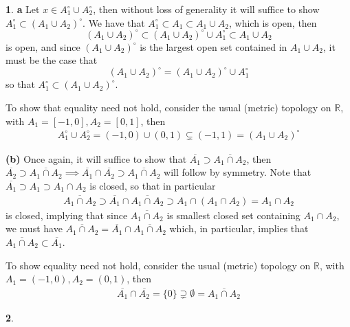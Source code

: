 \documentclass[10.5pt]{article}
\theoremstyle{definition}
\newtheorem{pb}{}
\newcommand{\set}[1]{\{#1\}}
\begin{document}
    \begin{pb}
        \textbf{a} Let \(x \in A_1^\circ \cup A_2^\circ\), then without loss of generality it will suffice to show \(A_1^\circ \subset (A_1 \cup A_2)^\circ\). We have that \(A_1^\circ \subset A_1 \subset A_1 \cup A_2\), which is open, then
        \[(A_1 \cup A_2)^\circ \subset (A_1 \cup A_2)^\circ \cup A_1^\circ \subset A_1 \cup A_2\]
        is open, and since  \((A_1 \cup A_2)^\circ\) is the largest open set contained in \(A_1 \cup A_2\), it must be the case that
        \[(A_1 \cup A_2)^\circ = (A_1 \cup A_2)^\circ \cup A_1^\circ\]
        so that \(A_1^\circ \subset (A_1 \cup A_2)^\circ\).
        
        To show that equality need not hold, consider the usual (metric) topology on \(\mathbb{R}\), with \(A_1 = [-1,0], A_2 = [0,1]\), then
        \begin{align*}
            A_1^\circ \cup A_2^\circ = (-1,0) \cup (0,1) \subsetneq (-1,1) = (A_1 \cup A_2)^\circ
        \end{align*}

        \textbf{(b)} Once again, it will suffice to show that \(\overline{A_1} \supset \overline{A_1 \cap A_2}\), then \(\overline{A_2} \supset \overline{A_1 \cap A_2} \implies \overline{A_1} \cap \overline{A_2} \supset \overline{A_1 \cap A_2}\) will follow by symmetry. Note that \(\overline{A_1} \supset A_1 \supset A_1\cap A_2\) is closed, so that in particular
        \begin{align*}
            \overline{A_1 \cap A_2} \supset \overline{A_1} \cap \overline{A_1 \cap A_2} \supset A_1 \cap (A_1 \cap A_2) = A_1 \cap A_2
        \end{align*}
        is closed, implying that since \(\overline{A_1 \cap A_2}\) is smallest closed set containing \(A_1 \cap A_2\), we must have \(\overline{A_1 \cap A_2} = \overline{A_1} \cap \overline{A_1 \cap A_2}\) which, in particular, implies that \(\overline{A_1 \cap A_2} \subset \overline{A_1}\).

        To show equality need not hold, consider the usual (metric) topology on \(\mathbb{R}\), with \(A_1 = (-1,0), A_2 = (0,1)\), then
        \begin{align*}
            \overline{A_1}\cap \overline{A_2} = \set{0} \supsetneq \emptyset = \overline{A_1 \cap A_2}
        \end{align*}
    \end{pb}
    \begin{pb}
        
    \end{pb}
\end{document}

